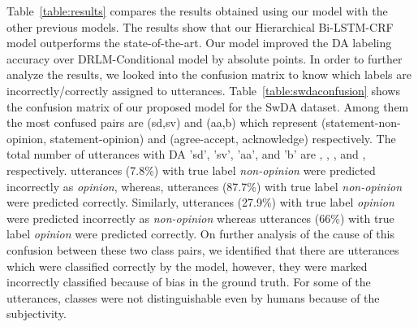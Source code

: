 \documentclass[letterpaper]{article} \usepackage{aaai18}
\begin{document}
Table~\ref{table:results} compares the results obtained using our model with the other previous models. The results show that our Hierarchical Bi-LSTM-CRF model outperforms the state-of-the-art. Our model improved the DA labeling accuracy over DRLM-Conditional model by  absolute points. In order to further analyze the results, we looked into the confusion matrix to know which labels are incorrectly/correctly assigned to utterances. Table~\ref{table:swdaconfusion} shows the confusion matrix of our proposed model for the SwDA dataset. Among them the most confused pairs are (sd,sv) and (aa,b) which represent (statement-non-opinion, statement-opinion) and (agree-accept, acknowledge) respectively. The total number of utterances with DA 'sd', 'sv', 'aa', and 'b' are , , , and , respectively.  utterances (7.8\%) with true label \textit{non-opinion} were predicted incorrectly as \textit{opinion}, whereas,  utterances (87.7\%) with true label \textit{non-opinion} were predicted correctly. Similarly,  utterances (27.9\%) with true label \textit{opinion} were predicted incorrectly as \textit{non-opinion} whereas  utterances (66\%) with true label \textit{opinion} were predicted correctly. On further analysis of the cause of this confusion between these two class pairs, we identified that there are utterances which were classified correctly by the model, however, they were marked incorrectly classified because of bias in the ground truth. For some of the utterances, classes were not distinguishable even by humans because of the subjectivity.
\end{document}
